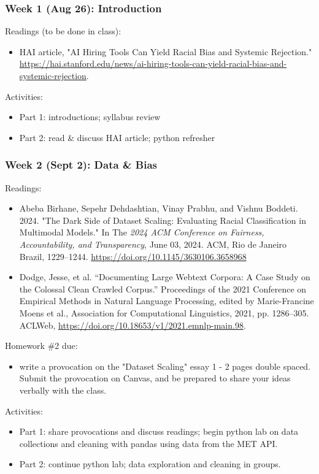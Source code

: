 \documentclass[12pt]{article}
\begin{document}
\subsubsection*{Week 1 (Aug 26): Introduction}
\label{sec:org3fceeaf}
Readings (to be done in class):
\begin{itemize}
\item HAI article, "AI Hiring Tools Can Yield Racial Bias and Systemic
Rejection."
\url{https://hai.stanford.edu/news/ai-hiring-tools-can-yield-racial-bias-and-systemic-rejection}.
\end{itemize}

Activities:
\begin{itemize}
\item Part 1: introductions; syllabus review
\item Part 2: read \& discuss HAI article; python refresher
\end{itemize}

\subsubsection*{Week 2 (Sept 2): Data \& Bias}
\label{sec:orge2f956d}
Readings:
\begin{itemize}
\item Abeba Birhane, Sepehr Dehdashtian, Vinay Prabhu, and Vishnu
Boddeti. 2024. "The Dark Side of Dataset Scaling: Evaluating Racial
Classification in Multimodal Models." In The \emph{2024 ACM Conference on
Fairness, Accountability, and Transparency}, June 03, 2024. ACM, Rio
de Janeiro Brazil, 1229–1244.
\url{https://doi.org/10.1145/3630106.3658968}
\item Dodge, Jesse, et al. “Documenting Large Webtext Corpora: A Case
Study on the Colossal Clean Crawled Corpus.” Proceedings of the 2021
Conference on Empirical Methods in Natural Language Processing,
edited by Marie-Francine Moens et al., Association for Computational
Linguistics, 2021, pp. 1286–305. ACLWeb,
\url{https://doi.org/10.18653/v1/2021.emnlp-main.98}.
\end{itemize}

Homework \#2 due:
\begin{itemize}
\item write a provocation on the "Dataset Scaling" essay 1 - 2 pages
double spaced. Submit the provocation on Canvas, and be prepared to
share your ideas verbally with the class.
\end{itemize}

Activities:
\begin{itemize}
\item Part 1: share provocations and discuss readings; begin python lab on
data collections and cleaning with pandas using data from the MET
API.
\item Part 2: continue python lab; data exploration and cleaning in
groups.
\end{itemize}
\end{document}
